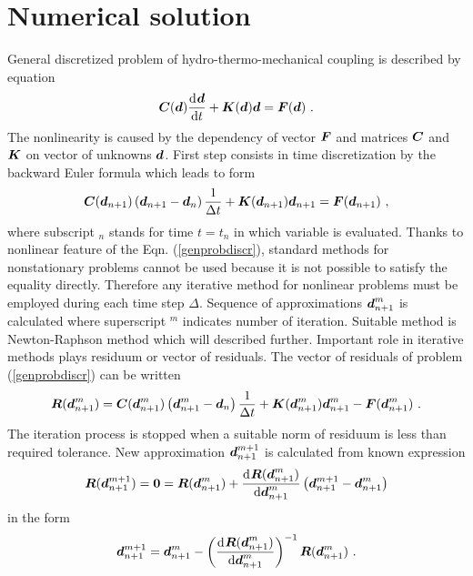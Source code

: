 \documentclass[12pt]{book}
\newcommand{\mbf}[1]{\mbox{\boldmath$#1$}}
\newcommand{\del}[2]{\mbox{$\displaystyle\frac{#1}{#2}$}}
\newcommand{\od}[2]{\del{{\rm d}\>\!{#1}}{{\rm d}{#2}}}
\begin{document}
\tableofcontents
\chapter{Numerical solution}
General discretized problem of hydro-thermo-mechanical coupling is described by equation
\begin{equation}
\mbf{C}(\mbf{d}) \od{\mbf{d}}{t} + \mbf{K}(\mbf{d}) \mbf{d} = \mbf{F}(\mbf{d}) \ .
\end{equation}
The nonlinearity is caused by the dependency of vector $\mbf{F}$ and matrices $\mbf{C}$ and $\mbf{K}$
on vector of unknowns $\mbf{d}$. First step consists in time discretization by the backward Euler
formula which leads to form
\begin{equation}\label{genprobdiscr}
\mbf{C}(\mbf{d}_{n+1}) \left(\mbf{d}_{n+1} - \mbf{d}_{n}\right)\del{1}{\Delta t} +
\mbf{K}(\mbf{d}_{n+1}) \mbf{d}_{n+1} = \mbf{F}(\mbf{d}_{n+1}) \ ,
\end{equation}
where subscript $_n$ stands for time $t=t_n$ in which variable is evaluated.
Thanks to nonlinear feature of the Eqn. (\ref{genprobdiscr}), standard methods for nonstationary problems
cannot be used because it is not possible to satisfy the equality directly. Therefore any iterative
method for nonlinear problems must be employed during each time step $\Delta$. Sequence of approximations
$\mbf{d}_{n+1}^{m}$ is calculated where superscript $^m$ indicates number of iteration.
Suitable method is Newton-Raphson method which will described further. Important role in iterative methods
plays residuum or vector of residuals. The vector of residuals of problem (\ref{genprobdiscr}) can be written
\begin{equation}\label{defresiduum}
\mbf{R}(\mbf{d}_{n+1}^m) = \mbf{C}(\mbf{d}_{n+1}^m) \left(\mbf{d}_{n+1}^m - \mbf{d}_{n}\right)\del{1}{\Delta t} +
\mbf{K}(\mbf{d}_{n+1}^m) \mbf{d}_{n+1}^m - \mbf{F}(\mbf{d}_{n+1}^m) \ .
\end{equation}
The iteration process is stopped when a suitable norm of residuum is less than required tolerance.
New approximation $\mbf{d}_{n+1}^{m+1}$ is calculated from known expression
\begin{equation}
\mbf{R}(\mbf{d}_{n+1}^{m+1}) = \mbf{0} = \mbf{R}(\mbf{d}_{n+1}^{m}) + \od{\mbf{R}(\mbf{d}_{n+1}^{m})}{\mbf{d}_{n+1}^{m}}
\left(\mbf{d}_{n+1}^{m+1} - \mbf{d}_{n+1}^{m}\right)
\end{equation}
in the form
\begin{equation}\label{gennewton}
\mbf{d}_{n+1}^{m+1} = \mbf{d}_{n+1}^{m} - \left(\od{\mbf{R}(\mbf{d}_{n+1}^{m})}{\mbf{d}_{n+1}^{m}}\right)^{-1}
\mbf{R}(\mbf{d}_{n+1}^{m})\ .
\end{equation}
\end{document}
